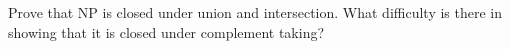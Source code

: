Prove that NP is closed under union and intersection. What difficulty
is there in showing that it is closed under complement taking?
